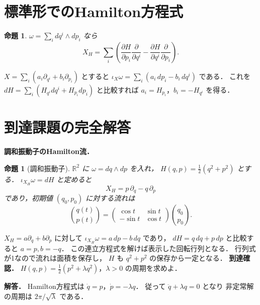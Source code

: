 \documentclass[a5paper,10pt,onecolumn]{jsarticle}
\makeatletter
\theoremstyle{mathnotetheorem}
\newtheorem{proposition}[theorem]{命題}
\renewcommand{\proofname}{証明}
\renewenvironment{proof}[1][\proofname]{%
  \par\pushQED{\qed}\normalfont\topsep4\p@\@plus2\p@\relax
  \trivlist\item[\hskip\labelsep\bfseries #1]\ignorespaces
}{\popQED\endtrivlist\@endpefalse}
\makeatother
\begin{document}
\section{標準形でのHamilton方程式}
\begin{proposition}
$\omega=\sum_i dq^i\wedge dp_i$ なら
\[
 X_H=\sum_i
 \left(\frac{\partial H}{\partial p_i}\frac{\partial}{\partial q^i}
 -\frac{\partial H}{\partial q^i}\frac{\partial}{\partial p_i}\right).
\]
\end{proposition}
\begin{proof}
$X=\sum_i(a_i\partial_{q^i}+b_i\partial_{p_i})$ とすると
$\iota_X\omega=\sum_i(a_i\,dp_i-b_i\,dq^i)$ である．
これを $dH=\sum_i(H_{q^i}dq^i+H_{p_i}dp_i)$ と比較すれば
$a_i=H_{p_i}$，$b_i=-H_{q^i}$ を得る．
\end{proof}

\section{到達課題の完全解答}
\noindent\textbf{調和振動子のHamilton流．}
\begin{proposition}[調和振動子]
$\mathbb R^2$ に $\omega=dq\wedge dp$ を入れ，
$H(q,p)=\frac12(q^2+p^2)$ とする．
$\iota_{X_H}\omega=dH$ と定めると
\[
X_H=p\,\partial_q-q\,\partial_p
\]
であり，初期値 $(q_0,p_0)$ に対する流れは
\[
\binom{q(t)}{p(t)}
=\begin{pmatrix}\cos t&\sin t\\-\sin t&\cos t\end{pmatrix}
\binom{q_0}{p_0}.
\]
\end{proposition}
\begin{proof}
$X_H=a\partial_q+b\partial_p$ に対して
$\iota_{X_H}\omega=a\,dp-b\,dq$ であり，
$dH=q\,dq+p\,dp$ と比較すると $a=p,b=-q$．
この連立方程式を解けば表示した回転行列となる．
行列式が1なので流れは面積を保存し，
$H$ も $q^2+p^2$ の保存から一定となる．
\end{proof}
\noindent\textbf{到達確認．}
$H(q,p)=\frac12(p^2+\lambda q^2)$，$\lambda>0$
の周期を求めよ．
\par\noindent\textbf{解答．}
Hamilton方程式は $\dot q=p$，$\dot p=-\lambda q$．
従って $\ddot q+\lambda q=0$ となり
非定常解の周期は $2\pi/\sqrt\lambda$ である．
\end{document}
